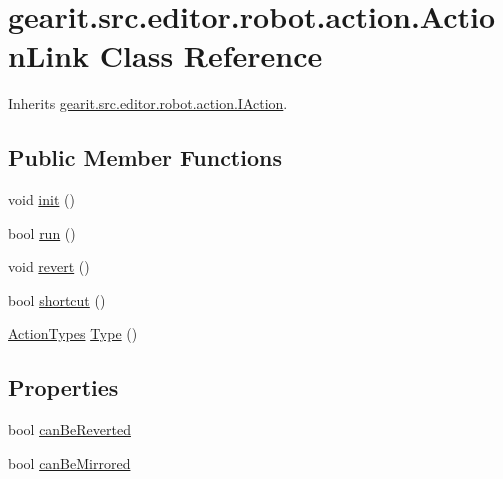 \hypertarget{classgearit_1_1src_1_1editor_1_1robot_1_1action_1_1_action_link}{\section{gearit.\+src.\+editor.\+robot.\+action.\+Action\+Link Class Reference}
\label{classgearit_1_1src_1_1editor_1_1robot_1_1action_1_1_action_link}
}


Inherits \hyperlink{interfacegearit_1_1src_1_1editor_1_1robot_1_1action_1_1_i_action}{gearit.\+src.\+editor.\+robot.\+action.\+I\+Action}.

\subsection*{Public Member Functions}
\begin{DoxyCompactItemize}
\item 
void \hyperlink{classgearit_1_1src_1_1editor_1_1robot_1_1action_1_1_action_link_ae8f7b73c9ae78b00eb2024c0f771bd44}{init} ()
\item 
bool \hyperlink{classgearit_1_1src_1_1editor_1_1robot_1_1action_1_1_action_link_a9e46d02170104f44128c024c6e33db68}{run} ()
\item 
void \hyperlink{classgearit_1_1src_1_1editor_1_1robot_1_1action_1_1_action_link_a2d6efeed7c4d106c0982289b73ccc98a}{revert} ()
\item 
bool \hyperlink{classgearit_1_1src_1_1editor_1_1robot_1_1action_1_1_action_link_a807398fd607067e316f6b01ac31c589d}{shortcut} ()
\item 
\hyperlink{namespacegearit_1_1src_1_1editor_1_1robot_1_1action_a4be0fd46e3952d6135136b20e7b3fc5e}{Action\+Types} \hyperlink{classgearit_1_1src_1_1editor_1_1robot_1_1action_1_1_action_link_aca2f29fde44a96b041ca2efe9feb0b22}{Type} ()
\end{DoxyCompactItemize}
\subsection*{Properties}
\begin{DoxyCompactItemize}
\item 
bool \hyperlink{classgearit_1_1src_1_1editor_1_1robot_1_1action_1_1_action_link_a5e9723b2669a907ff2d732adbcf7d2c8}{can\+Be\+Reverted}
\item 
bool \hyperlink{classgearit_1_1src_1_1editor_1_1robot_1_1action_1_1_action_link_a5d41488298b03db3ac4c5345e0ae0cdb}{can\+Be\+Mirrored}
\end{DoxyCompactItemize}


